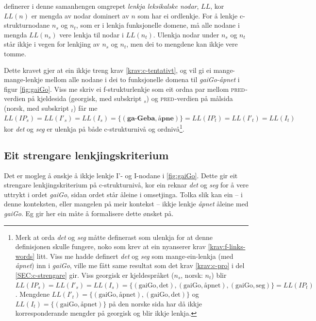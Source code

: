 \documentclass[12pt,a4paper,oneside,draft]{report}
\newcommand{\F}[2]{\textsc{#1}\ensuremath{_{#2}}}
\newcommand{\PRED}{\F{pred}{}}
\begin{document}
\citet[s.~77]{dyvik2009lmp} definerer i denne samanhengen
omgrepet \emph{lenkja leksikalske nodar}, $LL$, kor $LL(n)$ er mengda av
nodar dominert av $n$ som har ei ordlenkje. For å lenkje
c-strukturnodane $n_s$ og $n_t$, som er i lenkja funksjonelle domene,
må alle nodane i mengda $LL(n_s)$ vere lenkja til nodar i
$LL(n_t)$. Ulenkja nodar under $n_s$ og $n_t$ står ikkje i vegen for
lenkjing av $n_s$ og $n_t$, men dei to mengdene kan ikkje vere tomme.

Dette kravet gjer at ein ikkje treng krav \ref{krav:c-tentativt}, og
vil gi ei mange-mange-lenkje mellom alle nodane i dei to funksjonelle
domena til \emph{gaiGo-åpnet} i figur \ref{fig:gaiGo}. Viss me skriv ei
f-strukturlenkje som eit ordna par mellom \PRED{}-verdien på kjeldesida
(georgisk, med subskript $_s$) og \PRED{}-verdien på målsida (norsk, med
subskript $_t$) får me
$LL(IP_s)=LL(I'_s)=LL(I_s)=\{(\textbf{ga-Geba},\textbf{åpne})\}=LL(IP_t)=LL(I'_t)=LL(I_t)$
kor \emph{det} og \emph{seg} er ulenkja på både c-strukturnivå og ordnivå\footnote{\label{fn:LL-ordlenkje} Merk at orda \emph{det} og \emph{seg} måtte definerast som ulenkja for
        at denne definisjonen skulle fungere, noko som krev at ein nyanserer
        krav \ref{krav:f-links-words} litt. Viss me hadde definert
        \emph{det} og \emph{seg} som mange-ein-lenkja (med \emph{åpnet}) inn i
        \emph{gaiGo}, ville me fått same resultat som det krav
        \ref{krav:c-pro} i del \ref{SEC:c-strengare} gir.
        Viss georgisk er kjeldespråket
        ($n_s$, norsk: $n_t$) blir
        $LL(IP_s)=LL(I'_s)=LL(I_s)=\{(\text{gaiGo},\text{det}),(\text{gaiGo},\text{åpnet}),(\text{gaiGo},\text{seg})\}=LL(IP_t)$.
        Mengdene
        $LL(I'_t)=\{(\text{gaiGo},\text{åpnet}),(\text{gaiGo},\text{det})\}$
        og $LL(I_t)=\{(\text{gaiGo},\text{åpnet})\}$ på den norske
        sida har då ikkje korresponderande mengder på georgisk og blir
        ikkje lenkja. }.

\subsection{Eit strengare lenkjingskriterium}
\label{sec-3.7.2}

\label{SEC:c-strengare}

Det er mogleg å ønskje å ikkje lenkje I'- og I-nodane i
 \ref{fig:gaiGo}. Dette gir eit strengare lenkjingskriterium på
 c-strukturnivå, kor ein reknar \emph{det} og \emph{seg} for å vere uttrykt i
 ordet \emph{gaiGo}, sidan ordet står åleine i omsetjinga. Tolka slik kan
 ein -- i denne konteksten, eller mangelen på meir kontekst -- ikkje
 lenkje \emph{åpnet} åleine med \emph{gaiGo}. Eg gir her ein måte å formalisere
 dette ønsket på.
\end{document}
